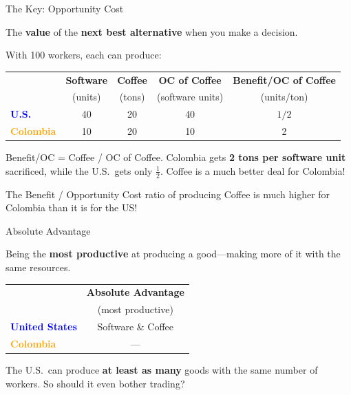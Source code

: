 \documentclass[9pt,english,aspectratio=169]{beamer}
\begin{document}
\begin{frame}{The Key: Opportunity Cost}

  \begin{definitionbox}
    The \textbf{value} of the \textbf{next best alternative} when you make a decision.
  \end{definitionbox}

  \vspace{1em}
  \centering
  {\small With 100 workers, each can produce:}

  \vspace{0.8em}
  \begin{tabular}{@{} l c c c c @{}}
    \toprule
    & \textbf{Software} & \textbf{Coffee} & \textbf{OC of Coffee} & \textbf{Benefit/OC of Coffee} \\
    & (units) & (tons) & (software units) & (units/ton) \\
    \midrule
    \textcolor{blue}{\textbf{U.S.}} & 40 & 20 & 40 & $1/2$ \\
    \textcolor{orange}{\textbf{Colombia}} & 10 & 20 & 10 & 2 \\
    \bottomrule
  \end{tabular}

  \vspace{0.8em}
  Benefit/OC = Coffee / OC of Coffee. Colombia gets \textbf{2 tons per software unit} sacrificed, while the U.S.\ gets only $\frac{1}{2}$. Coffee is a much better deal for Colombia!

    \pause 
    
  \vspace{0.5em}
  \begin{insightbox}
    The Benefit / Opportunity Cost ratio of producing Coffee is much higher for Colombia than it is for the US!
  \end{insightbox}

\end{frame}

\begin{frame}{Absolute Advantage}

  \begin{definitionbox}
    Being the \textbf{most productive} at producing a good---making more of it with the same resources.
  \end{definitionbox}

  \vspace{1.5em}
  \centering
  \begin{tabular}{@{} l c @{}}
    \toprule
    & \textbf{Absolute Advantage} \\
    & {\small (most productive)} \\
    \midrule
    \textcolor{blue}{\textbf{United States}} & Software \& Coffee \\[0.3em]
    \textcolor{orange}{\textbf{Colombia}} & --- \\
    \bottomrule
  \end{tabular}

  \vspace{1.5em}
  The U.S.\ can produce \textbf{at least as many} goods with the same number of workers. So should it even bother trading?

\end{frame}
\end{document}
